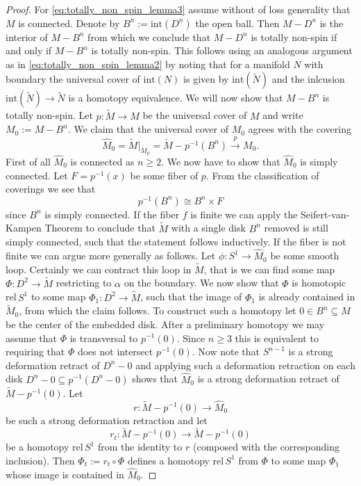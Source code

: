 \begin{proof}
    For \ref{eq:totally_non_spin_lemma3} assume without of loss generality that $M$ is connected. Denote by $B^n := \mathrm{int}(D^n)$ the open ball. Then $M - D^n$ is the interior of $M - B^n$ 
    from which we conclude that $M - D^n$ is totally non-spin if and only if $M- B^n$ is totally non-spin. This follows using an analogous argument as in \ref{eq:totally_non_spin_lemma2} by noting that for a manifold $N$ with boundary the universal cover of $\mathrm{int}(N)$ is given by $\mathrm{int}(\tilde{N})$ and the inlcusion $\mathrm{int}(\tilde{N}) \to \tilde{N}$ is a homotopy equivalence. We will now show that $M - B^n$ is totally non-spin. Let $p \colon \tilde{M} \to M$ be the universal cover of $M$ and write $M_0 := M - B^n$. We claim that the universal cover of $M_0$ agrees with the covering 
    \[
    \hat{M}_0 = \tilde{M}|_{M_0} = \tilde{M} - p^{-1}(B^n) \xrightarrow{p} M_0.
    \]
    First of all $\hat{M}_0$ is connected as $n \geq 2$. We now have to show that $\hat{M}_0$ is simply connected. Let $F = p^{-1}(x)$ be some fiber of $p$. From the classification of coverings we see that 
    \[
    p^{-1}(B^n) \cong B^n \times F
    \]
    since $B^n$ is simply connected. If the fiber $f$ is finite we can apply the Seifert-van-Kampen Theorem to conclude that $\tilde{M}$ with a single disk $B^n$ removed is still simply connected, such that the statement follows inductively. If the fiber is not finite we can argue more generally as follows. Let $\phi \colon S^1 \to \hat{M}_0$ be some smooth loop. Certainly we can contract this loop in $\tilde{M}$, that is we can find some map $\Phi \colon D^2 \to \tilde{M}$ restricting to $\alpha$ on the boundary. We now show that $\Phi$ is homotopic rel$\,S^1$ to some map $\Phi_1 \colon D^2 \to \tilde{M}$, such that the image of $\Phi_1$ is already contained in $\tilde{M}_0$, from which the claim follows. To construct such a homotopy let $0 \in B^n \subseteq M$ be the center of the embedded disk. After a preliminary homotopy we may assume that $\Phi$ is transversal to $p^{-1}(0)$. Since $n \geq 3$ this is equivalent to requiring that $\Phi$ does not intersect $p^{-1}(0)$. Now note that $S^{n-1}$ is a strong deformation retract of $D^n - 0$ and applying such a deformation retraction on each disk $D^n - 0 \subseteq p^{-1}(D^n - 0)$ shows that $\hat{M}_0$ is a strong deformation retract of $\tilde{M} - p^{-1}(0)$. Let 
    \[
    r \colon \tilde{M} - p^{-1}(0) \to \hat{M}_0
    \]
    be such a strong deformation retraction and let 
    \[
    r_t \colon \tilde{M} - p^{-1}(0) \to \tilde{M} - p^{-1}(0)
    \]
    be a homotopy rel$\,S^1$ from the identity to $r$ (composed with the corresponding inclusion). Then $\Phi_t := r_t \circ \Phi$ defines a homotopy rel$\,S^1$ from $\Phi$ to some map $\Phi_1$ whose image is contained in $\hat{M}_0$. 

\end{proof}
